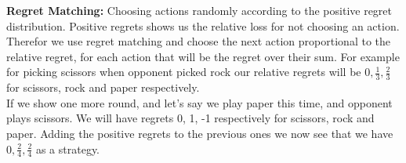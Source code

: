 \textbf{Regret Matching:} Choosing actions randomly according to the positive regret distribution.
Positive regrets shows us the relative loss for not choosing an action. Therefor we use regret matching
and choose the next action proportional to the relative regret, for each action that will be the regret
over their sum. For example for picking scissors when opponent picked rock our relative regrets will be 
$0, \frac{1}{3}, \frac{2}{3}$ for scissors, rock and paper respectively.\\

If we show one more round, and let's say we play paper this time, and opponent plays scissors. We will
have regrets 0, 1, -1 respectively for scissors, rock and paper. Adding the positive regrets to the 
previous ones we now see that we have $0, \frac{2}{4}, \frac{2}{4}$ as a strategy.


